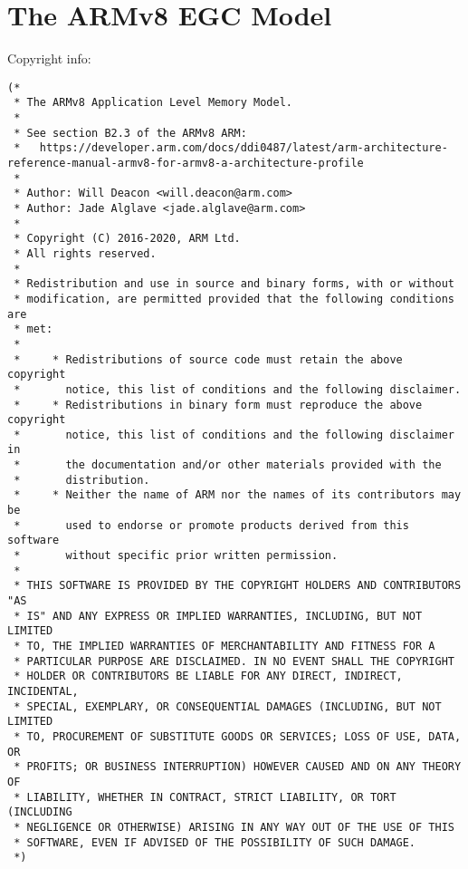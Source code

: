 \section{The ARMv8 EGC Model}
Copyright info:
\begin{verbatim}
(*
 * The ARMv8 Application Level Memory Model.
 *
 * See section B2.3 of the ARMv8 ARM:
 *   https://developer.arm.com/docs/ddi0487/latest/arm-architecture-reference-manual-armv8-for-armv8-a-architecture-profile
 *
 * Author: Will Deacon <will.deacon@arm.com>
 * Author: Jade Alglave <jade.alglave@arm.com>
 *
 * Copyright (C) 2016-2020, ARM Ltd.
 * All rights reserved.
 *
 * Redistribution and use in source and binary forms, with or without
 * modification, are permitted provided that the following conditions are
 * met:
 *
 *     * Redistributions of source code must retain the above copyright
 *       notice, this list of conditions and the following disclaimer.
 *     * Redistributions in binary form must reproduce the above copyright
 *       notice, this list of conditions and the following disclaimer in
 *       the documentation and/or other materials provided with the
 *       distribution.
 *     * Neither the name of ARM nor the names of its contributors may be
 *       used to endorse or promote products derived from this software
 *       without specific prior written permission.
 *
 * THIS SOFTWARE IS PROVIDED BY THE COPYRIGHT HOLDERS AND CONTRIBUTORS "AS
 * IS" AND ANY EXPRESS OR IMPLIED WARRANTIES, INCLUDING, BUT NOT LIMITED
 * TO, THE IMPLIED WARRANTIES OF MERCHANTABILITY AND FITNESS FOR A
 * PARTICULAR PURPOSE ARE DISCLAIMED. IN NO EVENT SHALL THE COPYRIGHT
 * HOLDER OR CONTRIBUTORS BE LIABLE FOR ANY DIRECT, INDIRECT, INCIDENTAL,
 * SPECIAL, EXEMPLARY, OR CONSEQUENTIAL DAMAGES (INCLUDING, BUT NOT LIMITED
 * TO, PROCUREMENT OF SUBSTITUTE GOODS OR SERVICES; LOSS OF USE, DATA, OR
 * PROFITS; OR BUSINESS INTERRUPTION) HOWEVER CAUSED AND ON ANY THEORY OF
 * LIABILITY, WHETHER IN CONTRACT, STRICT LIABILITY, OR TORT (INCLUDING
 * NEGLIGENCE OR OTHERWISE) ARISING IN ANY WAY OUT OF THE USE OF THIS
 * SOFTWARE, EVEN IF ADVISED OF THE POSSIBILITY OF SUCH DAMAGE.
 *)

\end{verbatim}

